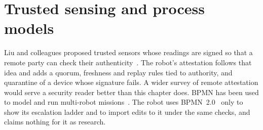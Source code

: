 \section{Trusted sensing and process models}

Liu and colleagues proposed trusted sensors whose readings are signed so that a remote party can
check their authenticity~\cite{liu2012trustedsensors}. The robot's attestation follows that idea and
adds a quorum, freshness and replay rules tied to authority, and quarantine of a device whose
signature fails. A wider survey of remote attestation would serve a security reader better than
this chapter does. BPMN has been used to model and run multi-robot missions~\cite{corradini2023bpmn}.
The robot uses BPMN~2.0~\cite{omg2011bpmn} only to show its escalation ladder and to import edits to
it under the same checks, and claims nothing for it as research.
